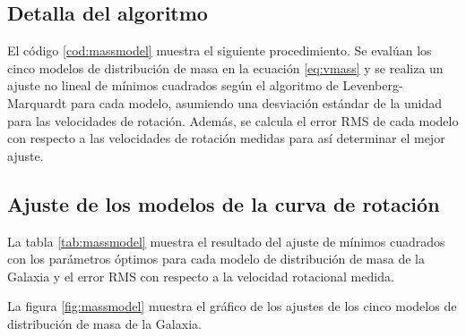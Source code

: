 \subsection{Detalla del algoritmo}

El código \ref{cod:massmodel} muestra el siguiente procedimiento. Se evalúan los cinco modelos de distribución de masa en la ecuación \ref{eq:vmass} y se realiza un ajuste no lineal de mínimos cuadrados según el algoritmo de Levenberg-Marquardt para cada modelo, asumiendo una desviación estándar de la unidad para las velocidades de rotación. Además, se calcula el error RMS de cada modelo con respecto a las velocidades de rotación medidas para así determinar el mejor ajuste.

\subsection{Ajuste de los modelos de la curva de rotación}

La tabla \ref{tab:massmodel} muestra el resultado del ajuste de mínimos cuadrados con los parámetros óptimos para cada modelo de distribución de masa de la Galaxia y el error RMS con respecto a la velocidad rotacional medida.

La figura \ref{fig:massmodel} muestra el gráfico de los ajustes de los cinco modelos de distribución de masa de la Galaxia.

\begin{table}[htpb]
	\centering
	\caption{Parámetros y error obtenido del ajuste no lineal de míminos cuadrados para los modelos de distribución de masa de la Galaxia con respecto a la velocidad rotacional medida.}\label{tab:massmodel}
\end{table}

